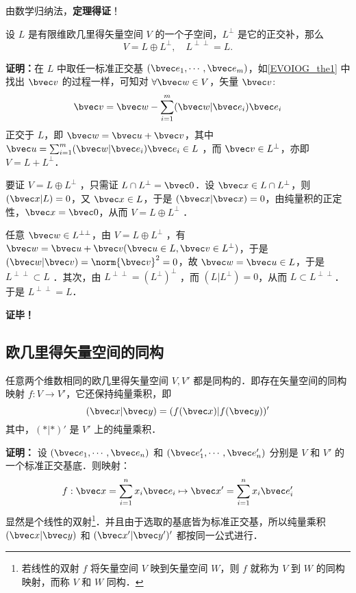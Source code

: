 由数学归纳法，\textbf{定理得证}！

\begin{theorem}{}
设 $L$ 是有限维欧几里得矢量空间 $V$ 的一个子空间，$L^{\perp}$ 是它的正交补，那么
\begin{equation}
V=L\oplus L^{\perp},\quad L^{\perp\perp}=L.
\end{equation}
\end{theorem}
\textbf{证明：}在 $L$ 中取任一标准正交基 $(\bvec e_1,\cdots,\bvec e_m)$，如\autoref{EVOIOG_the1} 中找出 $\bvec v$ 的过程一样，可知对 $\forall \bvec w\in V$，矢量 $\bvec v$:
\begin{equation}
\bvec v=\bvec w-\sum_{i=1}^m(\bvec w|\bvec e_i)\bvec e_i
\end{equation}
正交于 $L$，即 $\bvec w=\bvec u+\bvec v$，其中 $\bvec u=\sum_{i=1}^m(\bvec w|\bvec e_i)\bvec e_i\in L$ ，而 $\bvec v\in L^{\perp}$，亦即 $V=L+L^{\perp}$．

要证 $V=L\oplus L^{\perp}$ ，只需证 $L\cap L^{\perp}=\bvec 0$．设 $\bvec x\in L\cap L^{\perp}$，则 $(\bvec x|L)=0$，又 $\bvec x\in L$，于是 $(\bvec x|\bvec x)=0$，由纯量积的正定性，$\bvec x=\bvec 0$，从而 $V=L\oplus L^{\perp}$ ．

任意 $\bvec w\in L^{\perp\perp}$，由 $V=L\oplus L^{\perp}$ ，有 $\bvec w=\bvec u+\bvec v(\bvec u\in L,\bvec v\in L^{\perp})$，于是 $(\bvec w|\bvec v)=\norm{\bvec v}^2=0$，故 $\bvec w=\bvec u\in L$，于是 $L^{\perp\perp}\subset L$ ．其次，由 $L^{\perp\perp}=(L^{\perp})^{\perp}$ ，而 $(L|L^{\perp})=0$，从而 $L\subset L^{\perp\perp}$．于是 $L^{\perp\perp}=L$．

\textbf{证毕！}
\subsection{欧几里得矢量空间的同构}
\begin{theorem}{}
任意两个维数相同的欧几里得矢量空间 $V,V'$ 都是同构的．即存在矢量空间的同构映射 $f:V\rightarrow V'$，它还保持纯量乘积，即
\begin{equation}
(\bvec x|\bvec y)=(f(\bvec x)|f(\bvec y))'
\end{equation}
其中，$(*|*)'$ 是 $V'$ 上的纯量乘积．
\end{theorem}
\textbf{证明：} 设 $(\bvec e_1,\cdots,\bvec e_n)$ 和 $(\bvec e'_1,\cdots,\bvec e'_n)$ 分别是 $V$ 和 $V'$ 的一个标准正交基底．则映射：
\begin{equation}
f:\bvec x=\sum_{i=1}^{n}x_i\bvec e_i\mapsto\bvec x'=\sum_{i=1}^{n}x_i\bvec e'_i
\end{equation}
显然是个线性的双射\footnote{若线性的双射 $f$ 将矢量空间 $V$ 映到矢量空间 $W$，则 $f$ 就称为 $V$ 到 $W$ 的同构映射，而称 $V$ 和 $W$ 同构．}．并且由于选取的基底皆为标准正交基，所以纯量乘积 $(\bvec x|\bvec y)$ 和 $(\bvec x'|\bvec y')'$ 都按同一公式进行．

